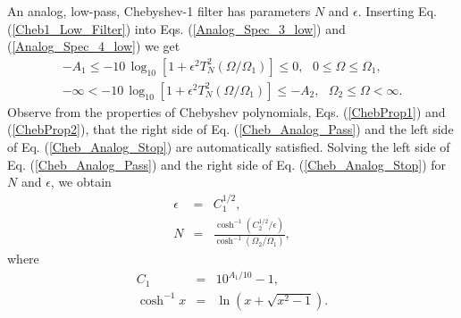 \documentclass{sebase}
\begin{document}
An analog, low-pass, Chebyshev-1 filter has parameters $N$ and $\epsilon $.
Inserting Eq. (\ref{Cheb1_Low_Filter}) into Eqs. (\ref{Analog_Spec_3_low})
and (\ref{Analog_Spec_4_low}) we get 
\begin{gather}
-A_{1}\leq -10\,\log _{10}\left[ 1+\epsilon ^{2}T_{N}^{2}\left( \Omega
/\Omega _{1}\right) \right] \leq 0,\text{ \ \ \ \ }0\leq \Omega \leq \Omega
_{1},  \label{Cheb_Analog_Pass} \\
-\infty <-10\,\log _{10}\left[ 1+\epsilon ^{2}T_{N}^{2}\left( \Omega /\Omega
_{1}\right) \right] \leq -A_{2},\text{ \ \ \ \ }\Omega _{2}\leq \Omega
<\infty .  \label{Cheb_Analog_Stop}
\end{gather}
Observe from the properties of Chebyshev polynomials, Eqs. (\ref{ChebProp1})
and (\ref{ChebProp2}), that the right side of Eq. (\ref{Cheb_Analog_Pass})
and the left side of Eq. (\ref{Cheb_Analog_Stop}) are automatically
satisfied. Solving the left side of Eq. (\ref{Cheb_Analog_Pass}) and the
right side of Eq. (\ref{Cheb_Analog_Stop}) for $N$ and $\epsilon $, we
obtain 
\begin{eqnarray}
\epsilon &=&C_{1}^{1/2},  \label{epsilon_Cheb} \\
N &=&\frac{\cosh ^{-1}\left( C_{2}^{1/2}/\epsilon \right) }{\cosh
^{-1}\left( \Omega _{2}/\Omega _{1}\right) },  \label{N_Low_Cheb1}
\end{eqnarray}
where 
\begin{eqnarray}
C_{1} &=&10^{A_{1}/10}-1, \\
\cosh ^{-1}x &=&\ln \left( x+\sqrt{x^{2}-1}\right) .
\end{eqnarray}


\end{document}
